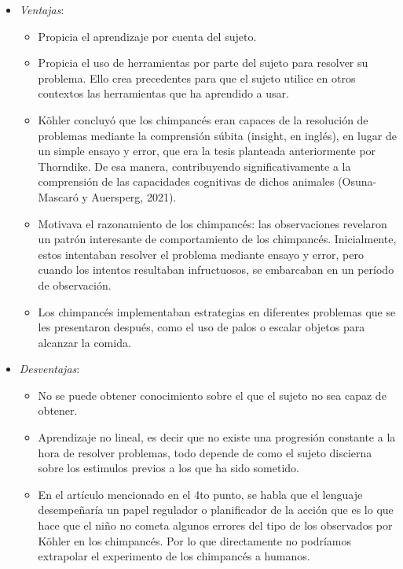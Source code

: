 \documentclass[12pt]{article}
\theoremstyle{largebreak}
\begin{document}
    \begin{itemize}
        \item \textit{Ventajas}:
        \begin{itemize}
            \item Propicia el aprendizaje por cuenta del sujeto.
            \item Propicia el uso de herramientas por parte del sujeto para resolver su problema. Ello crea precedentes para que el sujeto utilice en otros contextos las herramientas que ha aprendido a usar.
            \item Köhler concluyó que los chimpancés eran capaces de la resolución de problemas mediante la comprensión súbita (insight, en inglés), en lugar de un simple ensayo y error, que era la tesis planteada anteriormente por Thorndike. De esa manera, contribuyendo significativamente a la comprensión de las capacidades cognitivas de dichos animales (Osuna-Mascaró y Auersperg, 2021).
            \item Motivava el razonamiento de los chimpancés: las observaciones revelaron un patrón interesante de comportamiento de los chimpancés. Inicialmente, estos intentaban resolver el problema mediante ensayo y error, pero cuando los intentos resultaban infructuosos, se embarcaban en un período de observación.
            \item Los chimpancés implementaban estrategias en diferentes problemas que se les presentaron después, como el uso de palos o escalar objetos para alcanzar la comida.

        \end{itemize}
        \item \textit{Desventajas}:
        \begin{itemize}
            \item No se puede obtener conocimiento sobre el que el sujeto no sea capaz de obtener.
            \item Aprendizaje no lineal, es decir que no existe una progresión constante a la hora de resolver problemas, todo depende de como el sujeto discierna sobre los estimulos previos a los que ha sido sometido.
            \item  En el artículo mencionado en el 4to punto, se habla que el lenguaje desempeñaría un papel regulador o planificador de la acción que es lo que hace que el niño no cometa algunos errores del tipo de los observados por Köhler en los chimpancés. Por lo que directamente no podríamos extrapolar el experimento de los chimpancés a humanos.
        \end{itemize}
    \end{itemize}
\end{document}
